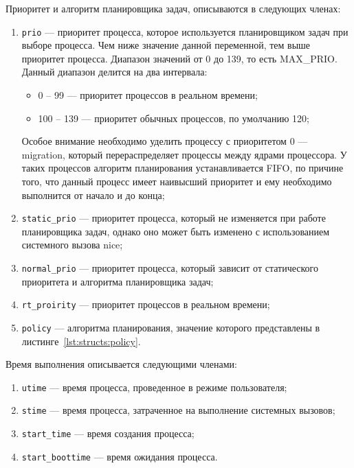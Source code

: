 Приоритет и алгоритм планировщика задач, описываются в следующих членах:
\begin{enumerate}
	\item \texttt{prio} --- приоритет процесса, которое используется планировщиком задач при выборе процесса. Чем ниже значение данной переменной, тем выше приоритет процесса. Диапазон значений от 0 до 139, то есть MAX\_PRIO. Данный диапазон делится на два интервала: 
	\begin{itemize}
		\item 0 -- 99 --- приоритет процессов в реальном времени;
		\item 100 -- 139 --- приоритет обычных процессов, по умолчанию 120;
	\end{itemize}
	Особое внимание необходимо уделить процессу с приоритетом 0 --- migration, который перераспределяет процессы между ядрами процессора. У таких процессов алгоритм планирования устанавливается FIFO, по причине того, что данный процесс имеет наивысший приоритет и ему необходимо выполнится от начало и до конца;
	\item \texttt{static\_prio} --- приоритет процесса, который не изменяется при работе планировщика задач, однако оно может быть изменено с использованием системного вызова nice;
	\item \texttt{normal\_prio} --- приоритет процесса, который зависит от статического приоритета и алгоритма планировщика задач; 
	\item \texttt{rt\_proirity} ---  приоритет процессов в реальном времени;
	\item \texttt{policy} --- алгоритма планирования, значение которого представлены в листинге~\ref{lst:structs:policy}.
\end{enumerate}



\clearpage

Время выполнения описывается следующими членами:
\begin{enumerate}
	\item \texttt{utime} --- время процесса, проведенное в режиме пользователя;
	\item \texttt{stime} --- время процесса, затраченное на выполнение системных вызовов;
	\item \texttt{start\_time} --- время создания процесса;
	\item \texttt{start\_boottime} --- время ожидания процесса.
\end{enumerate}

